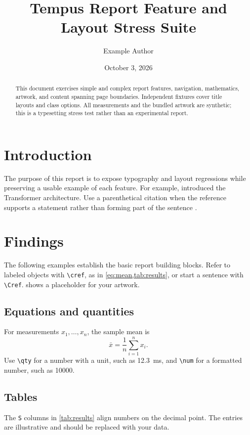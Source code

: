 \documentclass[algorithms,listings]{tempusreport}
\title{Tempus Report Feature and Layout Stress Suite}
\author{Example Author}
\date{October 3, 2026}
\begin{document}
\maketitle

\begin{abstract}
This document exercises simple and complex report features, navigation,
mathematics, artwork, and content spanning page boundaries. Independent
fixtures cover title layouts and class options. All measurements and the
bundled artwork are synthetic; this is a typesetting stress test rather
than an experimental report.
\end{abstract}

\clearpage
\reportcontents
\listoffigures
\listoftables
\listofalgorithms
\lstlistoflistings
\clearpage

\section{Introduction}
\label{sec:introduction}
The purpose of this report is to expose typography and layout regressions
while preserving a usable example of each feature.
For example, \citet{vaswani2017attention} introduced the Transformer
architecture. Use a parenthetical citation when the reference supports
a statement rather than forming part of the sentence
\citep{vaswani2017attention}.

\section{Findings}
\label{sec:findings}
The following examples establish the basic report building blocks. Refer to labeled objects
with \verb|\cref|, as in \cref{eq:mean,tab:results}, or start a sentence
with \verb|\Cref|.  shows a placeholder for your artwork.

\subsection{Equations and quantities}
For measurements $x_1,\ldots,x_n$, the sample mean is
\begin{equation}
  \bar{x} = \frac{1}{n}\sum_{i=1}^{n} x_i.
  \label{eq:mean}
\end{equation}
Use \verb|\qty| for a number with a unit, such as \qty{12.3}{\milli\second},
and \verb|\num| for a formatted number, such as \num{10000}.

\subsection{Tables}
The \texttt{S} columns in \cref{tab:results} align numbers on the decimal
point. The entries are illustrative and should be replaced with your data.
\end{document}
